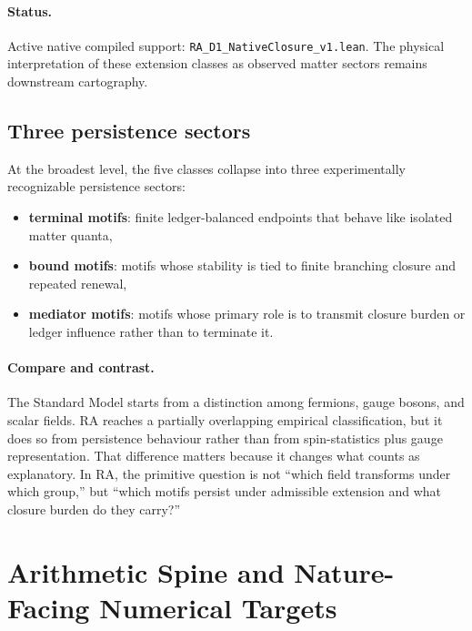 \documentclass[11pt]{article}
\begin{document}
\paragraph{Status.} Active native compiled support: \texttt{RA\_D1\_NativeClosure\_v1.lean}. The physical interpretation of these extension classes as observed matter sectors remains downstream cartography.

\subsection{Three persistence sectors}

At the broadest level, the five classes collapse into three experimentally recognizable persistence sectors:
\begin{itemize}[nosep]
    \item \textbf{terminal motifs}: finite ledger-balanced endpoints that behave like isolated matter quanta,
    \item \textbf{bound motifs}: motifs whose stability is tied to finite branching closure and repeated renewal,
    \item \textbf{mediator motifs}: motifs whose primary role is to transmit closure burden or ledger influence rather than to terminate it.
\end{itemize}

\paragraph{Compare and contrast.} The Standard Model starts from a distinction among fermions, gauge bosons, and scalar fields. RA reaches a partially overlapping empirical classification, but it does so from persistence behaviour rather than from spin-statistics plus gauge representation. That difference matters because it changes what counts as explanatory. In RA, the primitive question is not ``which field transforms under which group,'' but ``which motifs persist under admissible extension and what closure burden do they carry?''

\section{Arithmetic Spine and Nature-Facing Numerical Targets}
\end{document}
